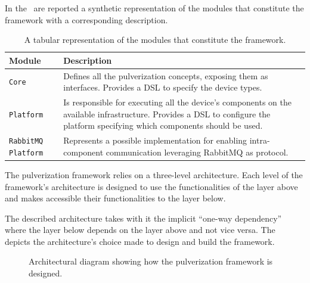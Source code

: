 In the~ are reported a synthetic representation of the modules that constitute the framework with a corresponding
description.

\begin{table}
	\begin{tabularx}{\textwidth}{l X}
		\toprule
		\textbf{Module}            & \textbf{Description}                                                                                             \\ \midrule
		\texttt{Core}              & Defines all the pulverization concepts, exposing them as interfaces.
		Provides a DSL to specify the device types.                                                                                                   \\
		\texttt{Platform}          & Is responsible for executing all the device's components on the available infrastructure.
		Provides a DSL to configure the platform specifying which components should be used.                                                          \\
		\texttt{RabbitMQ Platform} & Represents a possible implementation for enabling intra-component communication leveraging RabbitMQ as protocol. \\ \bottomrule
	\end{tabularx}
	\caption{A tabular representation of the modules that constitute the framework.}
	\label{tab:framework-modules}
\end{table}

The pulverization framework relies on a three-level architecture. Each level of the framework's architecture is designed to use the functionalities
of the layer above and makes accessible their functionalities to the layer below.

The described architecture takes with it the implicit ``one-way dependency'' where the layer below depends on the layer above and not vice versa.
The~ depicts the architecture's choice made to design and build the framework.

\begin{figure}
	\centering
	\caption{Architectural diagram showing how the pulverization framework is designed.}
	\label{fig:framework-architecture}
\end{figure}

